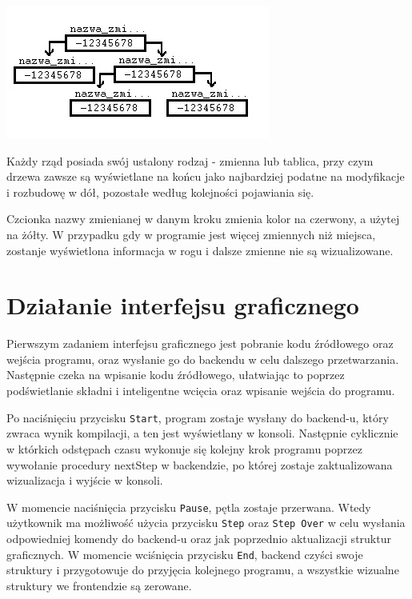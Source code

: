 \documentclass[a4paper,twoside,openright,11pt]{report}
\begin{document}
\begin{center}
  \includegraphics[scale=0.8]{wiz3}
\end{center}

\par Każdy rząd posiada swój ustalony rodzaj - zmienna lub tablica, przy czym drzewa zawsze są wyświetlane na końcu jako najbardziej podatne na modyfikacje i rozbudowę w dół, pozostałe według kolejności pojawiania się. 
\par Czcionka nazwy zmienianej w danym kroku zmienia kolor na czerwony, a użytej na żółty. W przypadku gdy w programie jest więcej zmiennych niż miejsca, zostanje wyświetlona informacja w rogu i dalsze zmienne nie są wizualizowane. 

  \section{Działanie interfejsu graficznego}
\par Pierwszym zadaniem interfejsu graficznego jest pobranie kodu źródłowego oraz wejścia programu, oraz wysłanie go do backendu w celu dalszego przetwarzania. Następnie czeka na wpisanie kodu źródłowego, ułatwiając to poprzez podświetlanie składni i inteligentne wcięcia oraz wpisanie wejścia do programu. 
\par Po naciśnięciu przycisku \texttt{Start}, program zostaje wysłany do backend-u, który zwraca wynik kompilacji, a ten jest wyświetlany w konsoli. Następnie cyklicznie w którkich odstępach czasu wykonuje się kolejny krok programu poprzez wywołanie procedury nextStep w backendzie, po której zostaje zaktualizowana wizualizacja i wyjście w konsoli.
\par W momencie naciśnięcia przycisku \texttt{Pause}, pętla zostaje przerwana. Wtedy użytkownik ma możliwość użycia przycisku \texttt{Step} oraz \texttt{Step Over} w celu wysłania odpowiedniej komendy do backend-u oraz jak poprzednio aktualizacji struktur graficznych. W momencie wciśnięcia przycisku \texttt{End}, backend czyści swoje struktury i przygotowuje do przyjęcia kolejnego programu, a wszystkie wizualne struktury we frontendzie są zerowane.
\end{document}
